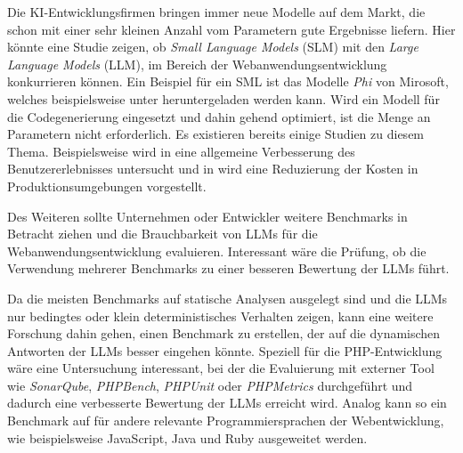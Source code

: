 Die KI-Entwicklungsfirmen bringen immer neue Modelle auf dem Markt, die schon mit einer sehr kleinen Anzahl vom Parametern gute Ergebnisse liefern. Hier könnte eine Studie zeigen, ob \textit{Small Language Models} (SLM) mit den \textit{Large Language Models} (LLM), im Bereich der Webanwendungsentwicklung konkurrieren können. Ein Beispiel für ein SML ist das Modelle \textit{Phi} von Mirosoft, welches beispielsweise unter \cite{phi2_huggingface_2024} heruntergeladen werden kann. Wird ein Modell für die Codegenerierung eingesetzt und dahin gehend optimiert, ist die Menge an Parametern nicht erforderlich. Es existieren bereits einige Studien zu diesem Thema. Beispielsweise wird in \cite{hu-2024} eine allgemeine Verbesserung des Benutzererlebnisses untersucht und in \cite{irugalbandara-2023} wird eine Reduzierung der Kosten in Produktionsumgebungen vorgestellt.\vspace{0.2cm}

Des Weiteren sollte Unternehmen oder Entwickler weitere Benchmarks in Betracht ziehen und die Brauchbarkeit von LLMs für die Webanwendungsentwicklung evaluieren. Interessant wäre die Prüfung, ob die Verwendung mehrerer Benchmarks zu einer besseren Bewertung der LLMs führt.\vspace{0.2cm}

Da die meisten Benchmarks auf statische Analysen ausgelegt sind und die LLMs nur bedingtes oder klein deterministisches Verhalten zeigen, kann eine weitere Forschung dahin gehen, einen Benchmark zu erstellen, der auf die dynamischen Antworten der LLMs besser eingehen könnte. Speziell für die PHP-Entwicklung wäre eine Untersuchung interessant, bei der die Evaluierung mit externer Tool wie \textit{SonarQube}, \textit{PHPBench}, \textit{PHPUnit} oder \textit{PHPMetrics} durchgeführt und dadurch eine verbesserte Bewertung der LLMs  erreicht wird.  Analog kann so ein Benchmark auf für andere relevante Programmiersprachen der Webentwicklung, wie beispielsweise JavaScript, Java und Ruby ausgeweitet werden.\vspace{0.2cm}

